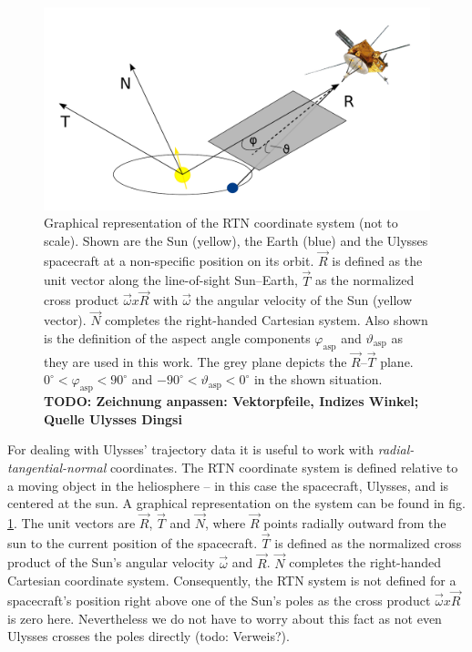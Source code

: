 \begin{figure}[h]
	\includegraphics[width=1\textwidth]{Figures/RTN_AA_angles.pdf}
	\centering
	\caption{Graphical representation of the RTN coordinate system (not to scale). Shown are the Sun (yellow), the Earth (blue) and the Ulysses spacecraft at a non-specific position on its orbit. $\vec{R}$ is defined as the unit vector along the line-of-sight Sun--Earth, $\vec{T}$ as the normalized cross product $\vec{\omega} x \vec{R}$ with $\vec{\omega}$ the angular velocity of the Sun (yellow vector). $\vec{N}$ completes the right-handed Cartesian system. Also shown is the definition of the aspect angle components $\varphi_{\mathrm{asp}}$ and $\vartheta_{\mathrm{asp}}$ as they are used in this work. The grey plane depicts the $\vec{R}$--$\vec{T}$ plane. $0 ^\circ < \varphi_{\mathrm{asp}} < 90^\circ$ and $-90 ^\circ < \vartheta_{\mathrm{asp}} < 0^\circ$ in the shown situation. \textbf{TODO: Zeichnung anpassen: Vektorpfeile, Indizes Winkel; Quelle Ulysses Dingsi}}
	\label{fig:rtn}
\end{figure}


For dealing with Ulysses' trajectory data it is useful to work with \textit{radial-tangential-normal} coordinates. The RTN coordinate system is defined relative to a moving object in the heliosphere -- in this case the spacecraft, Ulysses, and is centered at the sun. A graphical representation on the system can be found in fig. \ref{fig:rtn}. The unit vectors are $\vec{R}$, $\vec{T}$ and $\vec{N}$, where $\vec{R}$ points radially outward from the sun to the current position of the spacecraft. $\vec{T}$ is defined as the normalized cross product of the Sun's angular velocity $\vec{\omega}$ and $\vec{R}$. $\vec{N}$ completes the right-handed Cartesian coordinate system. Consequently, the RTN system is not defined for a spacecraft's position right above one of the Sun's poles as the cross product $\vec{\omega} x \vec{R}$ is zero here. Nevertheless we do not have to worry about this fact as not even Ulysses crosses the poles directly (todo: Verweis?).




